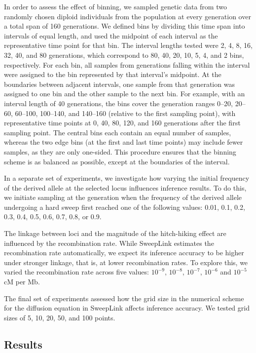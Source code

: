\documentclass{article}
\begin{document}
In order to assess the effect of binning, we sampled genetic data from two randomly chosen diploid individuals from the population at every generation over a total span of 160 generations.
We defined bins by dividing this time span into intervals of equal length, and used the midpoint of each interval as the representative time point for that bin.
The interval lengths tested were 2, 4, 8, 16, 32, 40, and 80 generations, which correspond to 80, 40, 20, 10, 5, 4, and 2 bins, respectively.
For each bin, all samples from generations falling within the interval were assigned to the bin represented by that interval's midpoint.
At the boundaries between adjacent intervals, one sample from that generation was assigned to one bin and the other sample to the next bin.
For example, with an interval length of 40 generations, the bins cover the generation ranges 0–20, 20–60, 60–100, 100–140, and 140–160 (relative to the first sampling point), with representative time points at 0, 40, 80, 120, and 160 generations after the first sampling point.
The central bins each contain an equal number of samples, whereas the two edge bins (at the first and last time points) may include fewer samples, as they are only one-sided.
This procedure ensures that the binning scheme is as balanced as possible, except at the boundaries of the interval.

In a separate set of experiments, we investigate how varying the initial frequency of the derived allele at the selected locus influences inference results.
To do this, we initiate sampling at the generation when the frequency of the derived allele undergoing a hard sweep first reached one of the following values: 0.01, 0.1, 0.2, 0.3, 0.4, 0.5, 0.6, 0.7, 0.8, or 0.9.

The linkage between loci and the magnitude of the hitch-hiking effect are influenced by the recombination rate.
While SweepLink estimates the recombination rate automatically, we expect its inference accuracy to be higher under stronger linkage, that is, at lower recombination rates.
To explore this, we varied the recombination rate across five values: $10^{-9}$, $10^{-8}$, $10^{-7}$, $10^{-6}$ and $10^{-5}$ cM per Mb.

The final set of experiments assessed how the grid size in the numerical scheme for the diffusion equation in SweepLink affects inference accuracy.
We tested grid sizes of 5, 10, 20, 50, and 100 points.


\subsection{Results}
\end{document}
